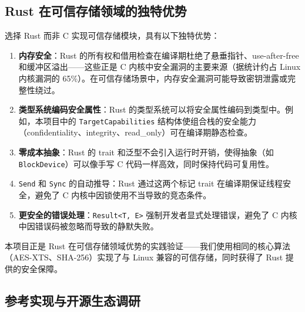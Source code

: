 \subsection{Rust 在可信存储领域的独特优势}

选择 Rust 而非 C 实现可信存储模块，具有以下独特优势：

\begin{enumerate}
    \item \textbf{内存安全}：Rust 的所有权和借用检查在编译期杜绝了悬垂指针、use-after-free 和缓冲区溢出——这些正是 C 内核中安全漏洞的主要来源（据统计约占 Linux 内核漏洞的 65\%）。在可信存储场景中，内存安全漏洞可能导致密钥泄露或完整性绕过。
    
    \item \textbf{类型系统编码安全属性}：Rust 的类型系统可以将安全属性编码到类型中。例如，本项目中的 \texttt{TargetCapabilities} 结构体使组合栈的安全能力（confidentiality、integrity、read\_only）可在编译期静态检查。
    
    \item \textbf{零成本抽象}：Rust 的 trait 和泛型不会引入运行时开销，使得抽象（如 \texttt{BlockDevice}）可以像手写 C 代码一样高效，同时保持代码可复用性。
    
    \item \texttt{Send} 和 \texttt{Sync} 的自动推导：Rust 通过这两个标记 trait 在编译期保证线程安全，避免了 C 内核中因锁使用不当导致的竞态条件。
    
    \item \textbf{更安全的错误处理}：\texttt{Result<T, E>} 强制开发者显式处理错误，避免了 C 内核中因错误码被忽略而导致的静默失败。
\end{enumerate}

本项目正是 Rust 在可信存储领域优势的实践验证——我们使用相同的核心算法（AES-XTS、SHA-256）实现了与 Linux 兼容的可信存储，同时获得了 Rust 提供的安全保障。

\subsection{参考实现与开源生态调研}

